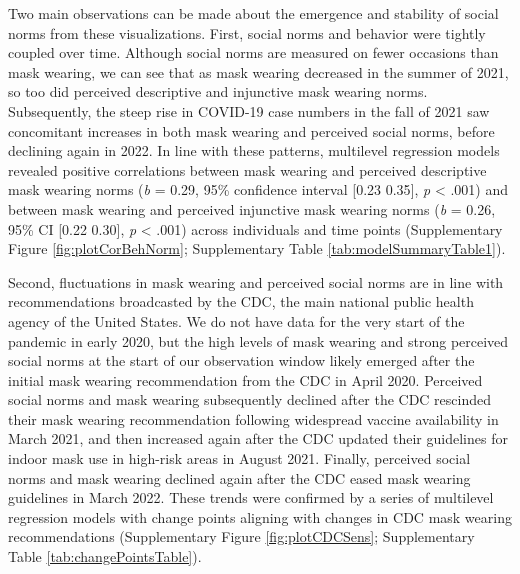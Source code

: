 \documentclass[
  man, donotrepeattitle,floatsintext]{apa6}
\begin{document}
Two main observations can be made about the emergence and stability of social norms from these visualizations. First, social norms and behavior were tightly coupled over time. Although social norms are measured on fewer occasions than mask wearing, we can see that as mask wearing decreased in the summer of 2021, so too did perceived descriptive and injunctive mask wearing norms. Subsequently, the steep rise in COVID-19 case numbers in the fall of 2021 saw concomitant increases in both mask wearing and perceived social norms, before declining again in 2022. In line with these patterns, multilevel regression models revealed positive correlations between mask wearing and perceived descriptive mask wearing norms (\emph{b} = 0.29, 95\% confidence interval {[}0.23 0.35{]}, \emph{p} \textless{} .001) and between mask wearing and perceived injunctive mask wearing norms (\emph{b} = 0.26, 95\% CI {[}0.22 0.30{]}, \emph{p} \textless{} .001) across individuals and time points (Supplementary Figure \ref{fig:plotCorBehNorm}; Supplementary Table \ref{tab:modelSummaryTable1}).

Second, fluctuations in mask wearing and perceived social norms are in line with recommendations broadcasted by the CDC, the main national public health agency of the United States. We do not have data for the very start of the pandemic in early 2020, but the high levels of mask wearing and strong perceived social norms at the start of our observation window likely emerged after the initial mask wearing recommendation from the CDC in April 2020. Perceived social norms and mask wearing subsequently declined after the CDC rescinded their mask wearing recommendation following widespread vaccine availability in March 2021, and then increased again after the CDC updated their guidelines for indoor mask use in high-risk areas in August 2021. Finally, perceived social norms and mask wearing declined again after the CDC eased mask wearing guidelines in March 2022. These trends were confirmed by a series of multilevel regression models with change points aligning with changes in CDC mask wearing recommendations (Supplementary Figure \ref{fig:plotCDCSens}; Supplementary Table \ref{tab:changePointsTable}).
\end{document}
